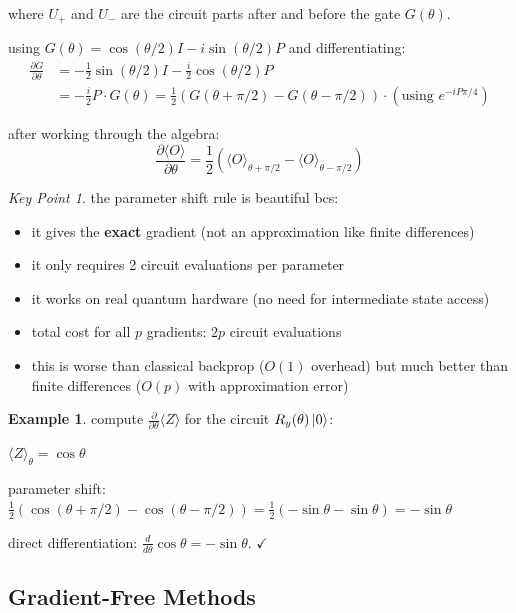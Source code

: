 \documentclass[11pt,a4paper]{article}
\theoremstyle{definition}
\newtheorem{example}{Example}[section]
\theoremstyle{remark}
\newtheorem*{keypoint}{Key Point}
\begin{document}
where $U_+$ and $U_-$ are the circuit parts after and before the gate $G(\theta)$.

using $G(\theta) = \cos(\theta/2)I - i\sin(\theta/2)P$ and differentiating:
\begin{align}
\frac{\partial G}{\partial \theta} &= -\frac{1}{2}\sin(\theta/2)I - \frac{i}{2}\cos(\theta/2)P \\
&= -\frac{i}{2}P \cdot G(\theta) = \frac{1}{2}(G(\theta + \pi/2) - G(\theta - \pi/2)) \cdot (\text{using } e^{-iP\pi/4})
\end{align}

after working through the algebra:
\[
\frac{\partial \langle O \rangle}{\partial \theta} = \frac{1}{2}\left(\langle O \rangle_{\theta + \pi/2} - \langle O \rangle_{\theta - \pi/2}\right)
\]

\begin{keypoint}
the parameter shift rule is beautiful bcs:
\begin{itemize}
    \item it gives the \textbf{exact} gradient (not an approximation like finite differences)
    \item it only requires 2 circuit evaluations per parameter
    \item it works on real quantum hardware (no need for intermediate state access)
    \item total cost for all $p$ gradients: $2p$ circuit evaluations
    \item this is worse than classical backprop ($O(1)$ overhead) but much better than finite differences ($O(p)$ with approximation error)
\end{itemize}
\end{keypoint}

\begin{example}
compute $\frac{\partial}{\partial \theta} \langle Z \rangle$ for the circuit $R_y(\theta)\ket{0}$:

$\langle Z \rangle_\theta = \cos\theta$

parameter shift: $\frac{1}{2}(\cos(\theta + \pi/2) - \cos(\theta - \pi/2)) = \frac{1}{2}(-\sin\theta - \sin\theta) = -\sin\theta$

direct differentiation: $\frac{d}{d\theta}\cos\theta = -\sin\theta$. $\checkmark$
\end{example}

\subsection{Gradient-Free Methods}
\end{document}
